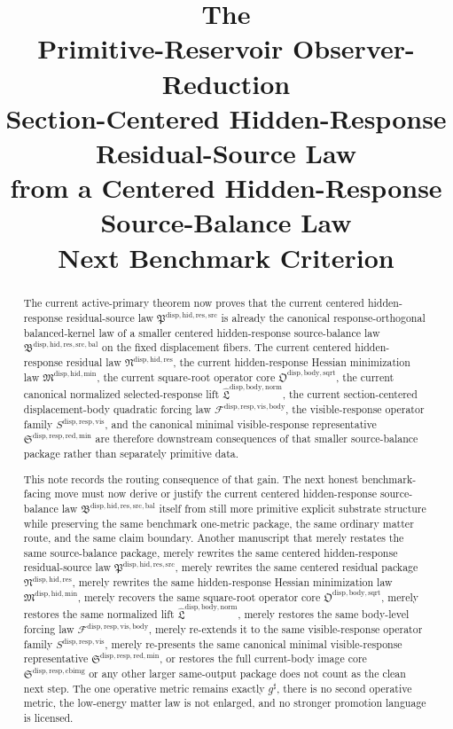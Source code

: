 \documentclass[11pt]{article}
\title{\textbf{The \TheoryName{}}\\[0.4em]
\large Primitive-Reservoir Observer-Reduction\\
\large Section-Centered Hidden-Response\\
\large Residual-Source Law\\
\large from a Centered Hidden-Response\\
\large Source-Balance Law\\
\large Next Benchmark Criterion}
\author{}
\date{}
\newcommand{\CompletedMetric}{g^{\sharp}}
\newcommand{\SourceBalanceLawPackage}{\mathfrak B^{\mathrm{disp,hid,res,src,bal}}}
\newcommand{\ResidualSourceLawPackage}{\mathfrak P^{\mathrm{disp,hid,res,src}}}
\newcommand{\ResidualLawPackage}{\mathfrak N^{\mathrm{disp,hid,res}}}
\newcommand{\HiddenMinimizationPackage}{\mathfrak M^{\mathrm{disp,hid,min}}}
\newcommand{\SquareRootOperatorCore}{\mathfrak O^{\mathrm{disp,body,sqrt}}}
\newcommand{\NormalizedLiftPackage}{\widehat{\mathfrak L}^{\mathrm{disp,body,norm}}}
\newcommand{\VisibleBodyForcingLaw}{\mathscr F^{\mathrm{disp,resp,vis,body}}}
\newcommand{\VisibleResponseOperator}{S^{\mathrm{disp,resp,vis}}}
\newcommand{\MinimalReducedStructure}{\mathfrak S^{\mathrm{disp,resp,red,min}}}
\newcommand{\CurrentBodyImageCore}{\mathfrak S^{\mathrm{disp,resp,cbimg}}}
\begin{document}
\maketitle

\begin{abstract}
The current active-primary theorem now proves that the current centered hidden-response residual-source law \(\ResidualSourceLawPackage\) is already the canonical response-orthogonal balanced-kernel law of a smaller centered hidden-response source-balance law \(\SourceBalanceLawPackage\) on the fixed displacement fibers. The current centered hidden-response residual law \(\ResidualLawPackage\), the current hidden-response Hessian minimization law \(\HiddenMinimizationPackage\), the current square-root operator core \(\SquareRootOperatorCore\), the current canonical normalized selected-response lift \(\NormalizedLiftPackage\), the current section-centered displacement-body quadratic forcing law \(\VisibleBodyForcingLaw\), the visible-response operator family \(\VisibleResponseOperator\), and the canonical minimal visible-response representative \(\MinimalReducedStructure\) are therefore downstream consequences of that smaller source-balance package rather than separately primitive data.

This note records the routing consequence of that gain. The next honest benchmark-facing move must now derive or justify the current centered hidden-response source-balance law \(\SourceBalanceLawPackage\) itself from still more primitive explicit substrate structure while preserving the same benchmark one-metric package, the same ordinary matter route, and the same claim boundary. Another manuscript that merely restates the same source-balance package, merely rewrites the same centered hidden-response residual-source law \(\ResidualSourceLawPackage\), merely rewrites the same centered residual package \(\ResidualLawPackage\), merely rewrites the same hidden-response Hessian minimization law \(\HiddenMinimizationPackage\), merely recovers the same square-root operator core \(\SquareRootOperatorCore\), merely restores the same normalized lift \(\NormalizedLiftPackage\), merely restores the same body-level forcing law \(\VisibleBodyForcingLaw\), merely re-extends it to the same visible-response operator family \(\VisibleResponseOperator\), merely re-presents the same canonical minimal visible-response representative \(\MinimalReducedStructure\), or restores the full current-body image core \(\CurrentBodyImageCore\) or any other larger same-output package does not count as the clean next step. The one operative metric remains exactly \(\CompletedMetric\), there is no second operative metric, the low-energy matter law is not enlarged, and no stronger promotion language is licensed.
\end{abstract}
\end{document}

